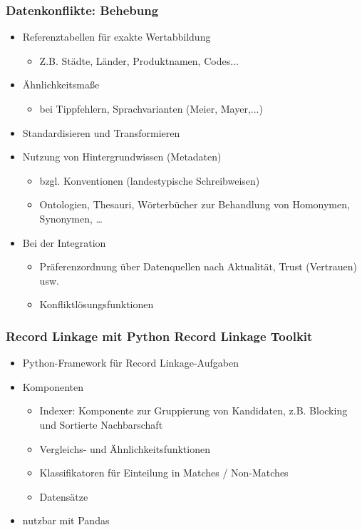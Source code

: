     \begin{frame}
    \frametitle{Datenkonflikte: Behebung}
    
    \begin{itemize}
    \item Referenztabellen für exakte Wertabbildung
    \begin{itemize}
    \item Z.B. Städte, Länder, Produktnamen, Codes...
    \end{itemize}
    \item Ähnlichkeitsmaße
    \begin{itemize}
    \item bei Tippfehlern, Sprachvarianten (Meier, Mayer,...)
    \end{itemize}
    \item Standardisieren und Transformieren
    \item Nutzung von Hintergrundwissen (Metadaten)
    \begin{itemize}
    \item bzgl. Konventionen (landestypische Schreibweisen)
    \item Ontologien, Thesauri, Wörterbücher zur Behandlung von Homonymen,
      Synonymen, \dots
    \end{itemize}
    \item Bei der Integration
    \begin{itemize}
    \item Präferenzordnung über Datenquellen nach Aktualität, Trust
      (Vertrauen) usw. 
    \item Konfliktlösungsfunktionen
    \end{itemize}
    \end{itemize}
    
    \end{frame}
    
    
    
    \begin{frame}
    \frametitle{Record Linkage mit Python Record Linkage Toolkit}
    
    \begin{itemize}
    \item Python-Framework für Record Linkage-Aufgaben
    \item Komponenten
    \begin{itemize}
    \item Indexer: Komponente zur Gruppierung von Kandidaten, z.B. Blocking und Sortierte Nachbarschaft
    \item Vergleichs- und Ähnlichkeitsfunktionen
    \item Klassifikatoren für Einteilung in Matches / Non-Matches
    \item Datensätze
    \end{itemize}
    \item nutzbar mit Pandas 
    \end{itemize}
    
    \end{frame}
    
